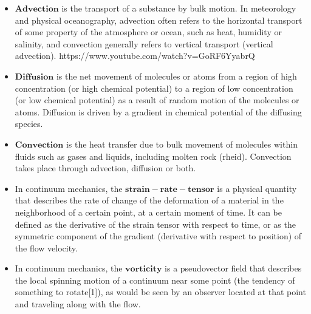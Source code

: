 \documentclass[a4paper]{article}
\begin{document}
\begin{itemize}
  \item $\mathbf{Advection}$ is the transport of a substance by bulk motion. In meteorology and physical oceanography, advection often refers to the horizontal transport of some property of the atmosphere or ocean, such as heat, humidity or salinity, and convection generally refers to vertical transport (vertical advection). https://www.youtube.com/watch?v=GoRF6YyabrQ
  \item $\mathbf{Diffusion}$ is the net movement of molecules or atoms from a region of high concentration (or high chemical potential) to a region of low concentration (or low chemical potential) as a result of random motion of the molecules or atoms. Diffusion is driven by a gradient in chemical potential of the diffusing species.
  \item $\mathbf{Convection}$ is the heat transfer due to bulk movement of molecules within fluids such as gases and liquids, including molten rock (rheid). Convection takes place through advection, diffusion or both. 
  \item In continuum mechanics, the $\mathbf{strain-rate-tensor}$ is a physical quantity that describes the rate of change of the deformation of a material in the neighborhood of a certain point, at a certain moment of time. It can be defined as the derivative of the strain tensor with respect to time, or as the symmetric component of the gradient (derivative with respect to position) of the flow velocity.
  \item In continuum mechanics, the $\mathbf{vorticity}$ is a pseudovector field that describes the local spinning motion of a continuum near some point (the tendency of something to rotate[1]), as would be seen by an observer located at that point and traveling along with the flow.
\end{itemize}
\end{document}
